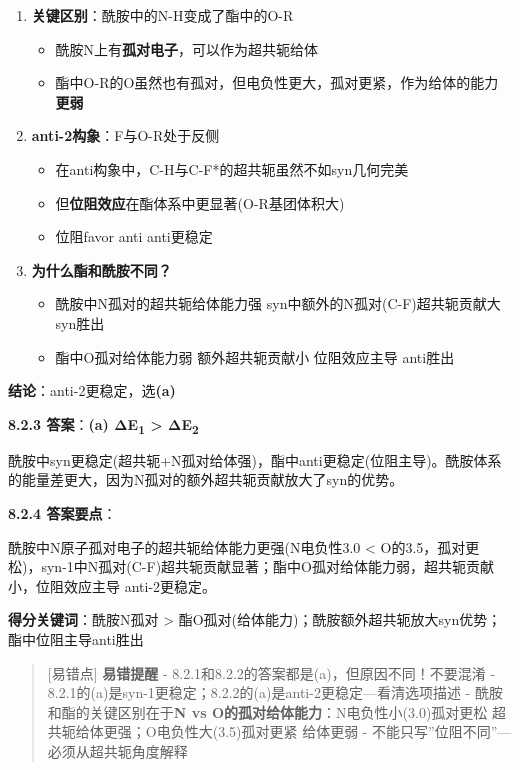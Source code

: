 \begin{enumerate}
\def\labelenumi{\arabic{enumi}.}
\tightlist
\item
  \textbf{关键区别}：酰胺中的N-H变成了酯中的O-R

  \begin{itemize}
  \tightlist
  \item
    酰胺N上有\textbf{孤对电子}，可以作为超共轭给体
  \item
    酯中O-R的O虽然也有孤对，但电负性更大，孤对更紧，作为给体的能力\textbf{更弱}
  \end{itemize}
\item
  \textbf{anti-2构象}：F与O-R处于反侧

  \begin{itemize}
  \tightlist
  \item
    在anti构象中，C-H与C-F*的超共轭虽然不如syn几何完美
  \item
    但\textbf{位阻效应}在酯体系中更显著(O-R基团体积大)
  \item
    位阻favor anti \箭 anti更稳定
  \end{itemize}
\item
  \textbf{为什么酯和酰胺不同？}

  \begin{itemize}
  \tightlist
  \item
    酰胺中N孤对的超共轭给体能力强 \箭 syn中额外的N孤对\箭(C-F)超共轭贡献大 \箭 syn胜出
  \item
    酯中O孤对给体能力弱 \箭 额外超共轭贡献小 \箭 位阻效应主导 \箭 anti胜出
  \end{itemize}
\end{enumerate}

\textbf{结论}：anti-2更稳定，选\textbf{(a)}

\textbf{8.2.3 答案}：\textbf{(a) ΔE\textsubscript{1} \textgreater{} ΔE\textsubscript{2}}

酰胺中syn更稳定(超共轭+N孤对给体强)，酯中anti更稳定(位阻主导)。酰胺体系的能量差更大，因为N孤对的额外超共轭贡献放大了syn的优势。

\textbf{8.2.4 答案要点}：

酰胺中N原子孤对电子的超共轭给体能力更强(N电负性3.0 \textless{} O的3.5，孤对更松)，syn-1中N孤对\箭(C-F)超共轭贡献显著；酯中O孤对给体能力弱，超共轭贡献小，位阻效应主导 \箭 anti-2更稳定。

\textbf{得分关键词}：酰胺N孤对 \textgreater{} 酯O孤对(给体能力)；酰胺额外超共轭放大syn优势；酯中位阻主导anti胜出

\begin{quote}
{[}易错点{]} \textbf{易错提醒}
- 8.2.1和8.2.2的答案都是(a)，但原因不同！不要混淆
- 8.2.1的(a)是syn-1更稳定；8.2.2的(a)是anti-2更稳定---看清选项描述
- 酰胺和酯的关键区别在于\textbf{N vs O的孤对给体能力}：N电负性小(3.0)\箭 孤对更松 \箭 超共轭给体更强；O电负性大(3.5)\箭 孤对更紧 \箭 给体更弱
- 不能只写''位阻不同''---必须从超共轭角度解释
\end{quote}

